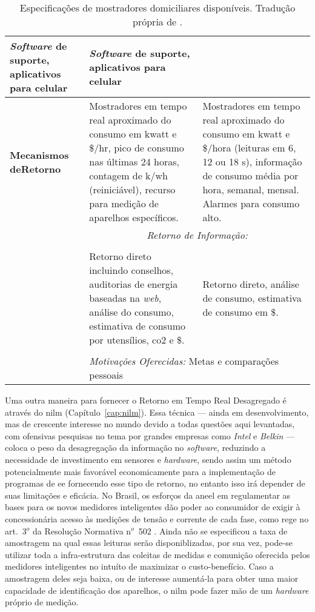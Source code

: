 \begin{table}[h!t]
{\begin{tabular}{p{4cm}p{7cm}p{7cm}}
\emph{Software} de suporte, aplicativos para celular &
\emph{Software} de suporte, aplicativos para celular \\
\hline
\textbf{Mecanismos de\newline Retorno} & 
Mostradores em tempo real aproximado do consumo em
k\acs{watt} e \$/hr, pico de consumo nas últimas 24 horas, contagem de
k/\acs{wh} (reiniciável), recurso para medição de aparelhos específicos. &
Mostradores em tempo real aproximado do consumo em k\acs{watt} e \$/hora
(leituras em 6, 12 ou 18 s), informação de consumo média por hora, semanal,
mensal. Alarmes para consumo alto. \\
\hline
{\multirow{5}{4cm}{\textbf{Principios Comportamentais}}} &
\multicolumn{2}{c}{\emph{Retorno de Informação:}} \\
& & \\
& 
Retorno direto incluindo conselhos, auditorias de energia baseadas na \emph{web},
análise do consumo, estimativa de consumo por utensílios, \gls{co2} e \$.  &
Retorno direto, análise de consumo, estimativa de consumo em \$.  \\
& & \\
&
\multicolumn{2}{p{14cm}}{\emph{Motivações Oferecidas:} 
\centering Metas e comparações pessoais}
\\
\hline \hline 
\end{tabular}
}
\caption[Especificações de mostradores domiciliares disponíveis.]{
Especificações de mostradores domiciliares disponíveis. Tradução própria de
\cite{aceee_2010_estudos_feedback}.}
\label{tab:servicos_ret_dir}
\end{table}


Uma outra maneira para fornecer o
Retorno em Tempo Real Desagregado é através do \gls{nilm}
(Capítulo~\ref{cap:nilm}). Essa técnica --- ainda em desenvolvimento,
mas de crescente interesse no mundo devido a todas questões aqui
levantadas, com ofensivas pesquisas no tema por grandes empresas como
\emph{Intel} e \emph{Belkin} --- coloca o peso da desagregação da
informação no \emph{software}, reduzindo a necessidade de investimento
em sensores e \emph{hardware}, sendo assim um método potencialmente
mais favorável economicamente para a implementação de programas de
\gls{ee} fornecendo esse tipo de retorno, no entanto isso irá depender
de suas limitações e eficácia.  No Brasil, os esforços da \gls{aneel}
em regulamentar as bases para os novos medidores inteligentes dão
poder ao consumidor de exigir à concessionária acesso às medições de
tensão e corrente de cada fase, como rege no art.~3$^o$ da Resolução
Normativa n$^o$~502 \cite{ren502}. Ainda não se especificou a taxa de
amostragem na qual essas leituras serão disponiblizadas, por sua vez,
pode-se utilizar toda a infra-estrutura das coleitas de medidas e
comunição oferecida pelos medidores inteligentes no intuíto de
maximizar o custo-benefício. Caso a amostragem deles seja baixa, ou de
interesse aumentá-la para obter uma maior capacidade de identificação
dos aparelhos, o \gls{nilm} pode fazer mão de um \emph{hardware}
próprio de medição.


